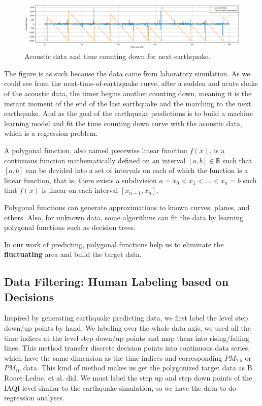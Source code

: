 \begin{figure}[!htbp]
    \begin{center}
    \includegraphics[width=\linewidth]{fig/acoustic_data.png}
    \end{center}
    \caption{Acoustic data and time counting down for next earthquake.}
    \label{fig:acoustic_data}
\end{figure}

The figure is as such because the data came from laboratory simulation. As we could see from the next-time-of-earthquake curve, after a sudden and acute shake of the acoustic data, the timer begins another counting down, meaning it is the instant moment of the end of the last earthquake and the marching to the next earthquake. And as the goal of the earthquake predictions is to build a machine learning model and fit the time counting down curve with the acoustic data, which is a regression problem.

A polygonal function, also named piecewise linear function $f(x)$, is a continuous function mathematically defined on an interval $[a, b]\in \mathbb R$ such that $[a, b]$ can be devided into a set of intervals on each of which the function is a linear function, that is, there exists a subdivision $a=x_0 < x_1 < ... < x_n=b$ such that $f(x)$ is linear on each interval $[x_{n-1}, x_n]$.

Polygonal functions can generate approximations to known curves, planes, and others. Also, for unknown data, some algorithms can fit the data by learning polygonal functions such as decision trees.

In our work of predicting, polygonal functions help us to eliminate the \textbf{fluctuating} area and build the target data.

\subsection{Data Filtering: Human Labeling based on Decisions}

Inspired by generating earthquake predicting data, we first label the level step down/up points by hand. We labeling over the whole data axis, we used all the time indices at the level step down/up points and map them into rising/falling lines. This method transfer discrete decision points into continuous data series, which have the same dimension as the time indices and corresponding $PM_{2.5}$ or $PM_{10}$ data. This kind of method makes us get the polygonized target data as B. Rouet-Leduc, et al. \cite{rouet2017machine} did.
We must label the step up and step down points of the IAQI level similar to the earthquake simulation, so we have the data to do regression analyses.

